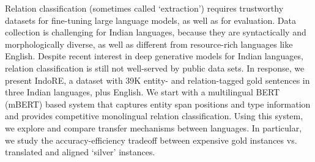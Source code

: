 Relation classification (sometimes called `extraction') requires trustworthy datasets for fine-tuning large language models, as well as for evaluation.  Data collection is challenging for Indian languages, because they are syntactically and morphologically diverse, as well as different from resource-rich languages like English. Despite recent interest in deep generative models for Indian languages, relation classification is still not well-served by public data sets.  In response, we present IndoRE, a dataset with 39K entity- and relation-tagged gold sentences in three Indian languages, plus English. We start with a multilingual BERT (mBERT) based system that captures entity span positions and type information and provides competitive monolingual relation classification.  Using this system, we explore and compare transfer mechanisms between languages. In particular, we study the accuracy-efficiency tradeoff between expensive gold instances vs. translated and aligned `silver' instances.
